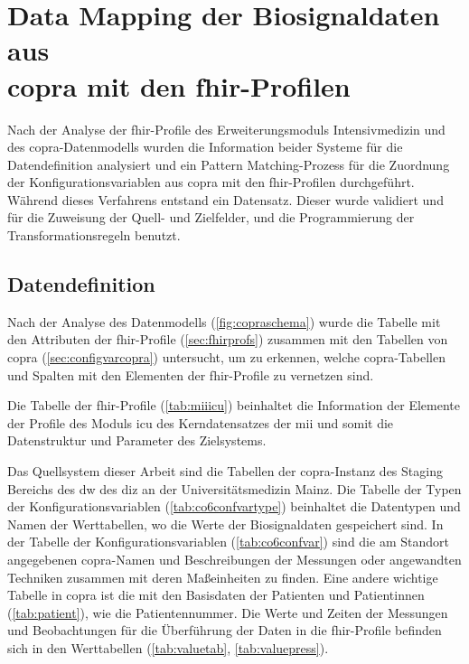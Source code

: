 \section[Data Mapping der Biosignaldaten aus \acs{copra} mit den \acs{fhir}-Profilen]{Data Mapping der Biosignaldaten aus \\ \acs{copra} mit den \acs{fhir}-Profilen} \label{sec:datamappingicucopra}

Nach der Analyse der \ac{fhir}-Profile des Erweiterungsmoduls \glqq Intensivmedizin\grqq{} und des \ac{copra}-Datenmodells wurden die Information beider Systeme für die Datendefinition analysiert und ein Pattern Matching-Prozess für die Zuordnung der Konfigurationsvariablen aus \ac{copra} mit den \ac{fhir}-Profilen durchgeführt. Während dieses Verfahrens entstand ein Datensatz. Dieser wurde validiert und für die Zuweisung der Quell- und Zielfelder, und die Programmierung der Transformationsregeln benutzt.

\subsection{Datendefinition} \label{subsec:datadef}

Nach der Analyse des Datenmodells (\ref{fig:copraschema}) wurde die Tabelle mit den Attributen der \ac{fhir}-Profile (\ref{sec:fhirprofs}) zusammen mit den Tabellen von \ac{copra} (\ref{sec:configvarcopra}) untersucht, um zu erkennen, welche \ac{copra}-Tabellen und Spalten mit den Elementen der \ac{fhir}-Profile zu vernetzen sind.

Die Tabelle der \ac{fhir}-Profile (\ref{tab:miiicu}) beinhaltet die Information der Elemente der Profile des Moduls \glqq\ac{icu}\grqq{} des Kerndatensatzes der \ac{mii} und somit die Datenstruktur und Parameter des Zielsystems.

Das Quellsystem dieser Arbeit sind die Tabellen der \ac{copra}-Instanz des Staging Bereichs des \ac{dw} des \ac{diz} an der Universitätsmedizin Mainz. Die Tabelle der Typen der Konfigurationsvariablen (\ref{tab:co6confvartype}) beinhaltet die Datentypen und Namen der Werttabellen, wo die Werte der Biosignaldaten gespeichert sind. In der Tabelle der Konfigurationsvariablen (\ref{tab:co6confvar}) sind die am Standort angegebenen \ac{copra}-Namen und Beschreibungen der Messungen oder angewandten Techniken zusammen mit deren Maßeinheiten zu finden. Eine andere wichtige Tabelle in \ac{copra} ist die mit den Basisdaten der Patienten und Patientinnen (\ref{tab:patient}), wie die Patientennummer. Die Werte und Zeiten der Messungen und Beobachtungen für die Überführung der Daten in die \ac{fhir}-Profile befinden sich in den Werttabellen (\ref{tab:valuetab}, \ref{tab:valuepress}).

